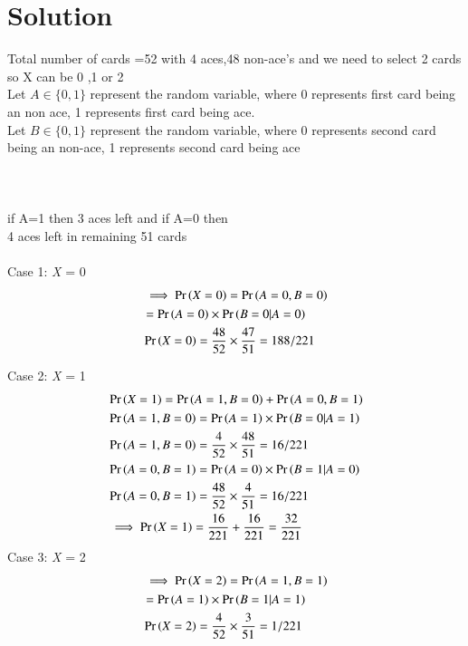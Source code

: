 \documentclass[journal,12pt,twocolumn]{IEEEtran}
\begin{document}
\section{Solution}
Total number of cards =52 with 4 aces,48 non-ace's and we need to select 2 cards
so X can be 0 ,1 or 2\\ 

Let $A \in \{0,1\}$ represent the random variable, where 0 represents first card being an non ace, 1 represents first card being ace. \\
Let $B \in \{0,1\}$ represent the random variable, where 0 represents second card being an non-ace, 1 represents second card being ace \\ \\
\hfill \\ \\
if A=1 then 3 aces left and if A=0 then\\ 4 aces left in remaining 51 cards\\ \\ 
Case 1: \emph{X} = 0
\begin{align}\nonumber
&\implies \Pr\left(X=0\right)=\Pr\left(A=0,B=0\right)\\ \nonumber
&=\Pr\left(A=0\right)\times \Pr\left(B=0|A=0\right)\\ \nonumber
&\Pr\left(X=0\right) = \frac{48}{52} \times \frac{47}{51}=188/221\\
\end{align}

Case 2: \emph{X} = 1
\begin{align}
\nonumber
&\Pr\left(X=1\right)=\Pr\left(A=1,B=0\right)+\Pr\left(A=0,B=1\right)\\ \nonumber 
&\Pr\left(A=1,B=0\right)=\Pr\left(A=1\right)\times \Pr\left(B=0|A=1\right)\\ \nonumber
&\Pr\left(A=1,B=0\right) = \frac{4}{52} \times \frac{48}{51}=16/221\\ \nonumber
&\Pr\left(A=0,B=1\right)=\Pr\left(A=0\right)\times \Pr\left(B=1|A=0\right)\\ \nonumber
&\Pr\left(A=0,B=1\right) = \frac{48}{52} \times \frac{4}{51}=16/221\\ \nonumber
&\implies\Pr\left(X=1\right)=\frac{16}{221}+\frac{16}{221}=\frac{32}{221}\\
\end{align}
Case 3: \emph{X} = 2
\begin{align}
\nonumber
&\implies \Pr\left(X=2\right)=\Pr\left(A=1,B=1\right)\\ \nonumber
& =\Pr\left(A=1\right)\times\Pr\left(B=1|A=1\right)\\ \nonumber
& \Pr\left(X=2\right) = \frac{4}{52} \times \frac{3}{51}=1/221\\
\end{align}
\end{document}
